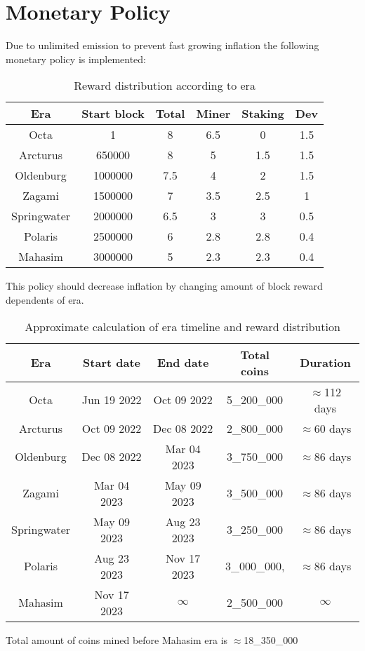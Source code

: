 \section{Monetary Policy}
\label{sec:mp}

Due to unlimited emission to prevent fast growing inflation the following monetary policy is implemented:

\begin{table}[h!]
\centering
\begin{tabular}{||c c c c c c||}
    \hline
        Era & Start block & Total & Miner & Staking & Dev \\ [0.5ex]

        \hline\hline
        Octa & 1 & 8 & 6.5 & 0 & 1.5 \\
        Arcturus & 650000 & 8 & 5 & 1.5 & 1.5 \\
        Oldenburg & 1000000 & 7.5 & 4 & 2 & 1.5 \\
        Zagami & 1500000 & 7 & 3.5 & 2.5 & 1 \\
        Springwater & 2000000 & 6.5 & 3 & 3 & 0.5 \\
        Polaris & 2500000 & 6 & 2.8 & 2.8 & 0.4 \\
        Mahasim & 3000000 & 5 & 2.3 & 2.3 & 0.4 \\ [1ex]
    \hline

\end{tabular}
\caption{Reward distribution according to era}
\label{table:1}
\end{table}

This policy should decrease inflation by changing amount of block reward dependents of era.

\begin{table}[h!]
\centering
\begin{tabular}{||c c c c c||}
    \hline
        Era & Start date & End date & Total coins & Duration \\ [0.5ex]

        \hline\hline
        Octa & Jun 19 2022 & Oct 09 2022 & 5\_200\_000 & $\approx$112 days \\
        Arcturus & Oct 09 2022 & Dec 08 2022 & 2\_800\_000 & $\approx$60 days \\
        Oldenburg & Dec 08 2022 & Mar 04 2023 & 3\_750\_000 & $\approx$86 days \\
        Zagami & Mar 04 2023 & May 09 2023 &  3\_500\_000 & $\approx$86 days \\
        Springwater & May 09 2023 & Aug 23 2023 & 3\_250\_000 & $\approx$86 days \\
        Polaris & Aug 23 2023& Nov 17 2023 & 3\_000\_000, & $\approx$86 days \\
        Mahasim & Nov 17 2023 & $\infty$ & 2\_500\_000 & $\infty$ \\ [1ex]
    \hline

\end{tabular}
\caption{Approximate calculation of era timeline and reward distribution}
\label{table:1}
\end{table}

Total amount of coins mined before Mahasim era is $\approx$18\_350\_000
